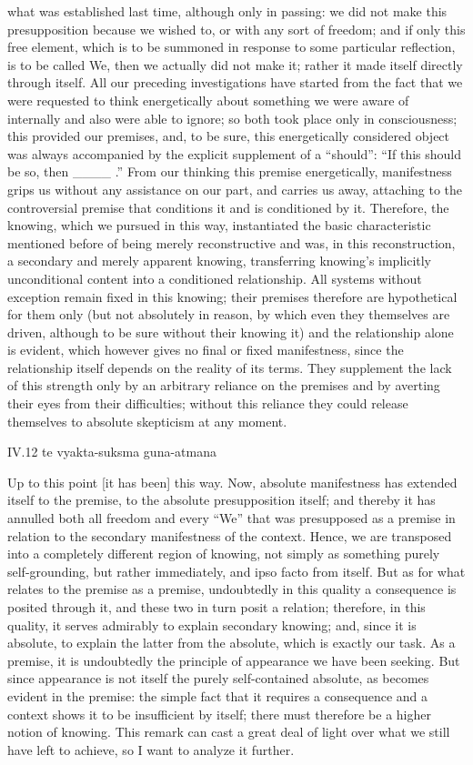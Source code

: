 what was established last time,
although only in passing:
we did not make this presupposition
because we wished to,
or with any sort of freedom;
and if only this free element,
which is to be summoned in response to
some particular reflection,
is to be called We,
then we actually did not make it;
rather it made itself directly through itself.
All our preceding investigations have started from
the fact that we were requested to think energetically
about something we were aware of internally and
also were able to ignore;
so both took place only in consciousness;
this provided our premises, and, to be sure,
this energetically considered object was always
accompanied by the explicit supplement of a “should”:
“If this should be so, then ____ .”
From our thinking this premise energetically,
manifestness grips us without any assistance on our part,
and carries us away, attaching to the controversial premise
that conditions it and is conditioned by it.
Therefore, the knowing, which we pursued in this way,
instantiated the basic characteristic mentioned before
of being merely reconstructive
and was, in this reconstruction,
a secondary and merely apparent knowing,
transferring knowing's implicitly unconditional content
into a conditioned relationship.
All systems without exception remain fixed in this knowing;
their premises therefore are hypothetical for them only
(but not absolutely in reason,
by which even they themselves are driven,
although to be sure without their knowing it)
and the relationship alone is evident,
which however gives no final or fixed manifestness,
since the relationship itself depends on
the reality of its terms.
They supplement the lack of this strength
only by an arbitrary reliance on the premises
and by averting their eyes from their difficulties;
without this reliance they could release themselves
to absolute skepticism at any moment.

IV.12
te vyakta-suksma guna-atmana

Up to this point [it has been] this way.
Now, absolute manifestness has extended itself to the premise,
to the absolute presupposition itself;
and thereby it has annulled both all freedom
and every “We” that was presupposed as a premise
in relation to the secondary manifestness of the context.
Hence, we are transposed into a
completely different region of knowing,
not simply as something purely self-grounding,
but rather immediately, and ipso facto from itself.
But as for what relates to the premise as a premise,
undoubtedly in this quality a consequence is posited through it,
and these two in turn posit a relation;
therefore, in this quality,
it serves admirably to
explain secondary knowing;
and, since it is absolute,
to explain the latter from the absolute,
which is exactly our task.
As a premise, it is undoubtedly
the principle of appearance we have been seeking.
But since appearance is not itself
the purely self-contained absolute,
as becomes evident in the premise:
the simple fact that it requires
a consequence and a context
shows it to be insufficient by itself;
there must therefore be a higher notion of knowing.
This remark can cast a great deal of light
over what we still have left to achieve,
so I want to analyze it further.

